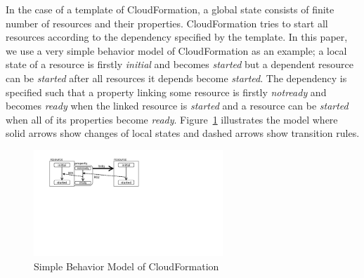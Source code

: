 \documentclass[12pt]{report}
\begin{document}
In the case of a template of CloudFormation, a global state consists
of finite number of resources and their properties. CloudFormation
tries to start all resources according to the dependency specified by
the template. In this paper, we use a very simple behavior model of
CloudFormation as an example; a local state of a resource is firstly
{\it initial} and becomes {\it started} but a dependent resource can
be {\it started} after all resources it depends become {\it started}.
The dependency is specified such that a property linking some resource
is firstly {\it notready} and becomes {\it ready} when the linked
resource is {\it started} and a resource can be {\it started} when all
of its properties become {\it ready}.  Figure~\ref{fig:R01R02}
illustrates the model where solid arrows show changes of local states
and dashed arrows show transition rules.
\begin{figure}
\centering
\includegraphics[height=4cm,natwidth=720,natheight=405,clip,trim=50 260 300 20]{R01R02.png}
\caption{Simple Behavior Model of CloudFormation}
\label{fig:R01R02}
\end{figure}
\end{document}

